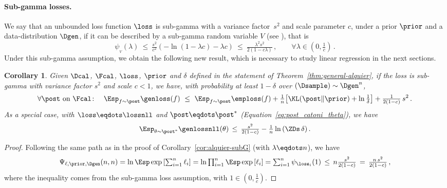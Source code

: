 \documentclass{article}
\newtheorem{cor}[thm]{Corollary}
\theoremstyle{definition}
\theoremstyle{plain}
\begin{document}
\paragraph{Sub-gamma losses.}
%
%
We say that an unbounded loss function $\loss$ is sub-gamma with a variance factor~$s^2$ and scale parameter $c$, under a prior $\prior$ and a data-distribution $\Dgen$, if it can be described by a 
%
sub-gamma random variable $V$ %
(see \citet[][Section 2.4]{boucheron-13}), that is 
\begin{equation}\label{eq:subgamma_assumption}
\psi_{_V}(\lambda)
\ \leq \ \tfrac{s^2}{c^2}({-}\ln(1{-}\lambda c) - \lambda c)
\ \leq \ {\tfrac{\lambda^2 s^2}{2(1-c\lambda)}}\,,  \qquad \forall \lambda  \in (0, \tfrac1c)\,.
\end{equation}
Under this sub-gamma assumption, we obtain the following new result, which is necessary to study linear regression in the next sections. 
\begin{cor} \label{cor:subgamma}
	Given $\Dcal$, $\Fcal$,  $\loss$,  $\prior$ and $\delta$ defined in the statement of Theorem~\ref{thm:general-alquier}, if the loss is sub-gamma with variance factor $s^2$ and scale $c<1$, we have,
	with probability at least $1{-}\delta$ over 
%
$(\Dsample)\sim \Dgen^n$,
	\begin{align} \label{eq:subgamma}
	\forall \post \text{ on } \Fcal\colon \quad 
	\Esp_{f\sim\post} \genloss(f) 
	\ \le \  \Esp_{f\sim\post} \emploss(f) +
	\tfrac{1}{n}\!\left[  \KL(\post\|\prior) +
	\ln\tfrac{1}{\delta}\right]+\tfrac1{2(1-c)}\, s^2\,.
	\end{align}
As a special case, with $\loss\eqdots\lossnll$ and $\post \eqdots \post^*$ (Equation~\ref{eq:post_catoni_theta}), we have
\begin{equation} \label{eq:subgammaZ} 
		\displaystyle\Esp_{\theta\sim\post^*} \genlossnll(\theta) 
		\, \leq\,
		\tfrac{s^2 }{2(1-c)}- \tfrac{1}{n}\ln\left( \ZDs\, \delta \right).
\end{equation}
\end{cor}
\begin{proof}
Following the same path as in the proof of Corollary~\ref{cor:alquier-subG} (with $\lambda\eqdots n$), we have
		\begin{align*}\textstyle
		\Psi_{\ell,\prior,\Dgen}(n,n)
		= \ln \Esp \exp \left[ \sum_{i=1}^n \ell_i\right]%
		= \ln \prod_{i=1}^n \Esp \exp \left[ \ell_i\right]
		= \sum_{i=1}^n \psi_{\loss_i}(1)
		\, \leq\, n \tfrac{s^2}{2(1-c)}
		\,=\,   \tfrac{n\,s^2}{2(1-c)}\,,
		\end{align*}
	where the inequality comes from the sub-gamma loss assumption, with $ 1\in(0,\frac1c)$.
\end{proof}
\end{document}

